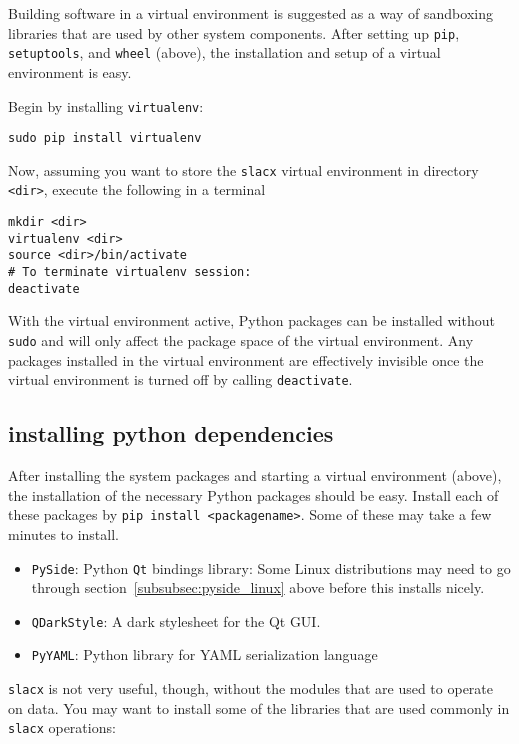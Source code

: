 Building software in a virtual environment is suggested 
as a way of sandboxing libraries that are used by other system components.
After setting up \verb|pip|, \verb|setuptools|, and \verb|wheel| (above),
the installation and setup of a virtual environment is easy.

Begin by installing \verb|virtualenv|:
\begin{lstlisting}
sudo pip install virtualenv
\end{lstlisting}

Now, assuming you want to store the \verb|slacx| virtual environment
in directory \verb|<dir>|,
execute the following in a terminal
\begin{lstlisting}
mkdir <dir> 
virtualenv <dir>
source <dir>/bin/activate
# To terminate virtualenv session:
deactivate
\end{lstlisting}

With the virtual environment active,
Python packages can be installed without \verb|sudo|
and will only affect the package space of the virtual environment.
Any packages installed in the virtual environment are effectively invisible
once the virtual environment is turned off by calling \verb|deactivate|.


\subsection{installing python dependencies}
\label{subsec:dependencies}

After installing the system packages and starting a virtual environment (above),
the installation of the necessary Python packages should be easy.
Install each of these packages by \verb|pip install <packagename>|.
Some of these may take a few minutes to install.

\begin{itemize}
\item \verb|PySide|: Python \verb|Qt| bindings library: 
    Some Linux distributions may need to go through section~\ref{subsubsec:pyside_linux} above
    before this installs nicely.
\item \verb|QDarkStyle|: A dark stylesheet for the Qt GUI.
\item \verb|PyYAML|: Python library for YAML serialization language 
\end{itemize}

\verb|slacx| is not very useful, though, without the modules that are used to operate on data.
You may want to install some of the libraries that are used commonly in \verb|slacx| operations:

